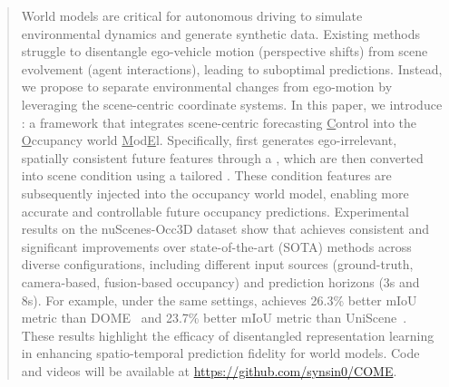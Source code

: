 \begin{abstract}
World models are critical for autonomous driving to simulate environmental dynamics and generate synthetic data.
Existing methods struggle to disentangle ego-vehicle motion (perspective shifts) from scene evolvement (agent interactions), leading to suboptimal predictions.
Instead, we propose to separate environmental changes from ego-motion by leveraging the scene-centric coordinate systems.
In this paper, we introduce \mtd{}: a framework that integrates scene-centric forecasting \underline{C}ontrol into the \underline{O}ccupancy world \underline{M}od\underline{E}l.
Specifically, \mtd{} first generates ego-irrelevant, spatially consistent future features through a \fvm{}, which are then converted into scene condition using a tailored \ctln{}.
These condition features are subsequently injected into the occupancy world model, enabling more accurate and controllable future occupancy predictions.
Experimental results on the nuScenes-Occ3D dataset show that \mtd{} achieves consistent and significant improvements over state-of-the-art (SOTA) methods across diverse configurations, including different input sources (ground-truth, camera-based, fusion-based occupancy) and prediction horizons (3s and 8s).
For example, under the same settings, \mtd{} achieves 26.3\% better mIoU metric than DOME~\cite{dome} and 23.7\% better mIoU metric than UniScene~\cite{uniscene}.
These results highlight the efficacy of disentangled representation learning in enhancing spatio-temporal prediction fidelity for world models.
Code and videos will be available at \url{https://github.com/synsin0/COME}.
\end{abstract}